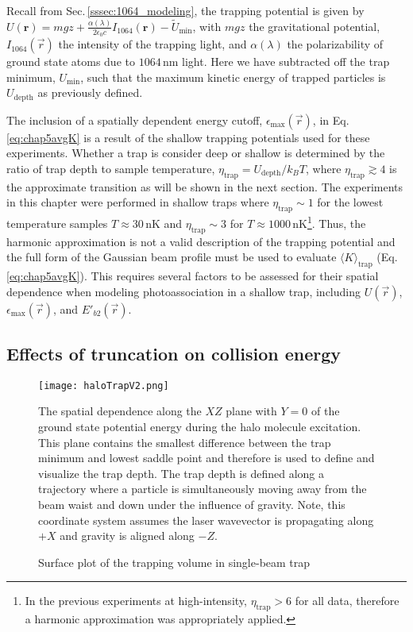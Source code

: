 Recall from Sec.\,\ref{sssec:1064_modeling}, the trapping potential is given by $U(\mathbf{r})=mgz + \frac{\alpha(\lambda)}{2 \epsilon_0 c} I_{1064}(\mathbf{r})-\tilde{U}_{\text{min}}$, with $mgz$ the gravitational potential, $I_{1064}(\vec{r})$ the intensity of the trapping light, and $\alpha(\lambda)$ the polarizability of ground state atoms due to $1064$\,nm light.
Here we have subtracted off the trap minimum, $U_{\text{min}}$, such that the maximum kinetic energy of trapped particles is $U_{\text{depth}}$ as previously defined.

The inclusion of a spatially dependent energy cutoff, $\epsilon_{\text{max}}(\vec{r})$, in Eq.\,\ref{eq:chap5avgK} is a result of the shallow trapping potentials used for these experiments.
Whether a trap is consider deep or shallow is determined by the ratio of trap depth to sample temperature, $\eta_{\text{trap}} = U_\text{depth}/k_B T$, where $\eta_{\text{trap}} \gtrsim 4$ is the approximate transition as will be shown in the next section.
The experiments in this chapter were performed in shallow traps where $\eta_\text{trap} \sim 1$ for the lowest temperature samples $T \approx 30$\,nK and $\eta_\text{trap} \sim 3$ for $T \approx 1000$\,nK\footnote{In the previous experiments at high-intensity, $\eta_\text{trap} > 6$ for all data, therefore a harmonic approximation was appropriately applied.}.
Thus, the harmonic approximation is not a valid description of the trapping potential and the full form of the Gaussian beam profile must be used to evaluate $\langle K \rangle_\text{trap}$ (Eq.\,\ref{eq:chap5avgK}).
This requires several factors to be assessed for their spatial dependence when modeling photoassociation in a shallow trap, including $U(\vec{r})$, $\epsilon_\text{max}(\vec{r})$, and $E'_{b2}(\vec{r})$.

\subsection{Effects of truncation on collision energy} \label{sec:trunc_trap}
	\begin{figure} 
	\centerline{
	  \texttt{[image: haloTrapV2.png]}}
	  \caption{Surface plot of the trapping volume in single-beam trap}{The spatial dependence along the $XZ$ plane with $Y=0$ of the ground state potential energy during the halo molecule excitation. This plane contains the smallest difference between the trap minimum and lowest saddle point and therefore is used to define and visualize the trap depth. 
	  The trap depth is defined along a trajectory where a particle is simultaneously moving away from the beam waist and down under the influence of gravity. Note, this coordinate system assumes the laser wavevector is propagating along $+X$ and gravity is aligned along $-Z$. }
	  \label{fig:haloTrapModel}
	\end{figure}
	
